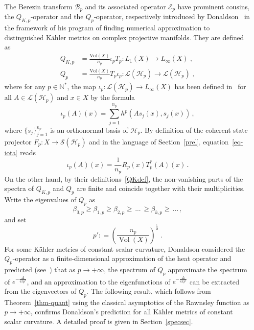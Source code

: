 \documentclass[11pt]{article}
\theoremstyle{definition}
\numberwithin{equation}{section}
\numberwithin{figure}{section}
\numberwithin{table}{section}
\DeclareMathOperator{\Vol}{Vol}
\newcommand{\N}{{\mathbb{N}}}
\newcommand{\cB}{{\mathcal{B}}}
\newcommand{\cE}{{\mathcal{E}}}
\newcommand{\cH}{{\mathcal{H}}}
\newcommand{\cS}{{\mathcal{S}}}
\newcommand{\Hilb}{\mathcal{H}}
\renewcommand\geq {\geqslant}
\newcommand\< {\mathcal{h}}
\renewcommand\> {\mathcal{i}}
\newcommand*\cL{\mathscr{L}}
\newcommand\fl {\rightarrow}
\begin{document}
The Berezin transform $\cB_p$ and its associated operator $\cE_p$ have prominent cousins, the $Q_{K,p}$-operator and the $Q_p$-operator, respectively introduced by Donaldson~\cite[Section~4]{D} in the framework of his program of finding numerical approximation to distinguished K\"ahler metrics on complex projective manifolds. They are defined as
\begin{equation}\label{QKdef}
\begin{split}
Q_{K,p}&= \frac{\text{Vol}(X)}{n_p} \iota_p T_p : L_1(X) \to L_{\infty}(X)\;,\\
Q_p &= \frac{\text{Vol}(X)}{n_p} T_p \iota_p: \cL(\Hilb_p) \to \cL(\Hilb_p)\;,
\end{split}
\end{equation}
where for any $p\in\N^*$, the map $\iota_p:\cL(\cH_p)\fl L_\infty(X)$ has been defined in~\cite[Section~2.2.1]{D} for all $A\in\cL(\cH_p)$ and $x\in X$ by the formula
\begin{equation}\label{eq-iota}
\iota_p(A)(x)=\sum_{j=1}^{n_p} h^{p}(As_j(x),s_j(x))\,,
\end{equation}
where $\{s_j\}_{j=1}^{n_p}$ is an orthonormal basis of $\cH_p$. By definition of the coherent state projector $F_p:X\rightarrow \cS(\Hilb_p)$ and in the language of Section~\ref{prel}, equation~\eqref{eq-iota} reads
\begin{equation}\label{iota=RT}
\iota_p(A)(x)=\frac{1}{n_p}R_p(x)T_p^*(A)(x)\,.
\end{equation}
On the other hand, by their definitions~\eqref{QKdef}, the non-vanishing parts of the spectra of $Q_{K,p}$ and $Q_p$ are finite and coincide together with their multiplicities. Write the eigenvalues of $Q_p$ as
\begin{equation}
\beta_{0,p}
\geq\beta_{1,p}\geq\beta_{2,p}\geq\,\dots\,\geq\beta_{k,p}\geq\,\dots\,,
\end{equation}
and set
\[
p' : = \left(\frac{n_p}{\Vol(X)}\right)^{\frac{1}{d}}\;.
\]
For some K\"ahler metrics of constant
scalar curvature, Donaldson considered the $Q_p$-operator as a finite-dimensional approximation of the heat operator and predicted (see~\cite[p.~611]{D}) that as $p\fl+\infty$, the spectrum of $Q_p$ approximate the spectrum of $e^{-\frac{\Delta}{4\pi p'} }$, and an approximation to the eigenfunctions of $e^{-\frac{\Delta}{4\pi p'} }$ can be extracted from the eigenvectors of $Q_p$. The following result, which follows from Theorem~\ref{thm-quant} using the classical asymptotics of the Rawnsley function as $p\fl+\infty$, confirms Donaldson's prediction for all K\"ahler metrics of constant scalar curvature. A detailed proof is given in Section~\ref{specsec}.
\end{document}
